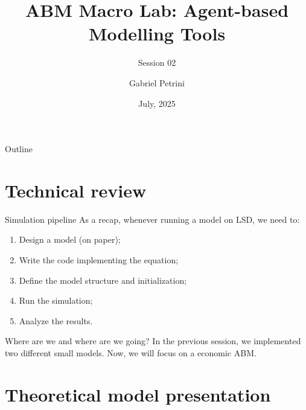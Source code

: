 \documentclass[bigger,aspectratio=169]{beamer}
\author{Gabriel Petrini}
\date{July, 2025}
\title{ABM Macro Lab: Agent-based Modelling Tools}
\subtitle{Session 02}
\begin{document}
\maketitle
\begin{frame}{Outline}
\tableofcontents
\end{frame}

\section{Technical review}
\label{sec:org5a16571}

\begin{frame}[label={sec:org0eaf694}]{Simulation pipeline}
As a recap, whenever running a model on LSD, we need to:

\begin{enumerate}
\item Design a model (on paper);
\item Write the code implementing the equation;
\item Define the model structure and initialization;
\item Run the simulation;
\item Analyze the results.
\end{enumerate}
\begin{block}{Where are we and where are we going?}
In the previous session, we implemented two different small models.
Now, we will focus on a economic ABM.
\end{block}
\end{frame}
\section{Theoretical model presentation}
\label{sec:org5b8bc4a}
\end{document}
